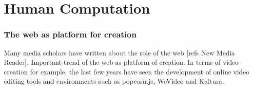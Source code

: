 \chapter{Human Computation}
\label{chap:Human Computation}

\subsection{The web as platform for creation}
\label{sec:platform}
Many media scholars have written about the role of the web [refs New Media Reader].
Important trend of the web as platform of creation. In terms of video creation for example, the last few years have seen the development of online video editing tools and environments such as popcorn.js, WeVideo and Kaltura.
